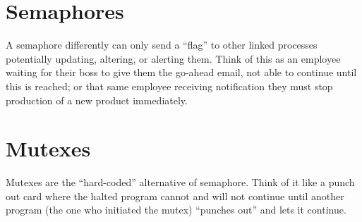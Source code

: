 \documentclass{article}
\begin{document}
    \section{Semaphores}

    A semaphore differently can only send a ``flag'' to other linked processes potentially updating, altering, or alerting them. Think of this as an employee waiting for their boss to give them the go-ahead email, not able to continue until this is reached; or that same employee receiving notification they must stop production of a new product immediately.

    \section{Mutexes}
    
    Mutexes are the ``hard-coded'' alternative of semaphore. Think of it like a punch out card where the halted program cannot and will not continue until another program (the one who initiated the mutex) “punches out” and lets it continue.
\end{document}
